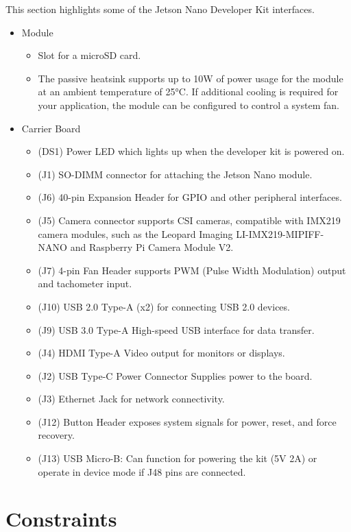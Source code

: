 This section highlights some of the Jetson Nano Developer Kit interfaces.
\begin{itemize}
	\item Module
	\begin{itemize}
		\item [J501] Slot for a microSD card.
		\item The passive heatsink supports up to 10W of power usage for the module at an ambient temperature of 25°C. If additional cooling is required for your application, the module can be configured to control a system fan.
	\end{itemize}
	\item Carrier Board
	\begin{itemize}
		\item (DS1) Power LED which lights up when the developer kit is powered on.
		\item (J1) SO-DIMM connector for attaching the Jetson Nano module.
		\item (J6) 40-pin Expansion Header for GPIO and other peripheral interfaces.
		\item (J5) Camera connector supports CSI cameras, compatible with IMX219 camera modules, such as the Leopard Imaging LI-IMX219-MIPIFF-NANO and Raspberry Pi Camera Module V2.
		\item (J7) 4-pin Fan Header supports PWM (Pulse Width Modulation) output and tachometer input.
		\item (J10) USB 2.0 Type-A (x2) for connecting USB 2.0 devices.
		\item (J9) USB 3.0 Type-A High-speed USB interface for data transfer.
		\item (J4) HDMI Type-A Video output for monitors or displays.
		\item (J2) USB Type-C Power Connector Supplies power to the board.
		\item (J3) Ethernet Jack for network connectivity.
		\item (J12) Button Header exposes system signals for power, reset, and force recovery.
		\item (J13) USB Micro-B: Can function for powering the kit (5V 2A) or operate in device mode if J48 pins are connected.
	\end{itemize}
\end{itemize}

\section{Constraints}

